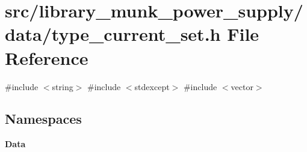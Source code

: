 \section{src/library\+\_\+munk\+\_\+power\+\_\+supply/data/type\+\_\+current\+\_\+set.h File Reference}
\label{type__current__set_8h}
{\ttfamily \#include $<$string$>$}\newline
{\ttfamily \#include $<$stdexcept$>$}\newline
{\ttfamily \#include $<$vector$>$}\newline
\subsection*{Namespaces}
\begin{DoxyCompactItemize}
\item 
 \textbf{ Data}
\end{DoxyCompactItemize}
